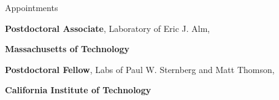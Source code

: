 \begin{rubric}{Appointments}

\entry*[01/2019--]
		\textbf{Postdoctoral Associate}, Laboratory of Eric J. Alm,
		\par \textbf{Massachusetts of Technology}

\entry*[11/2018--01/2019]
		\textbf{Postdoctoral Fellow}, Labs of Paul W. Sternberg and Matt Thomson,
		\par \textbf{California Institute of Technology}

\end{rubric}

